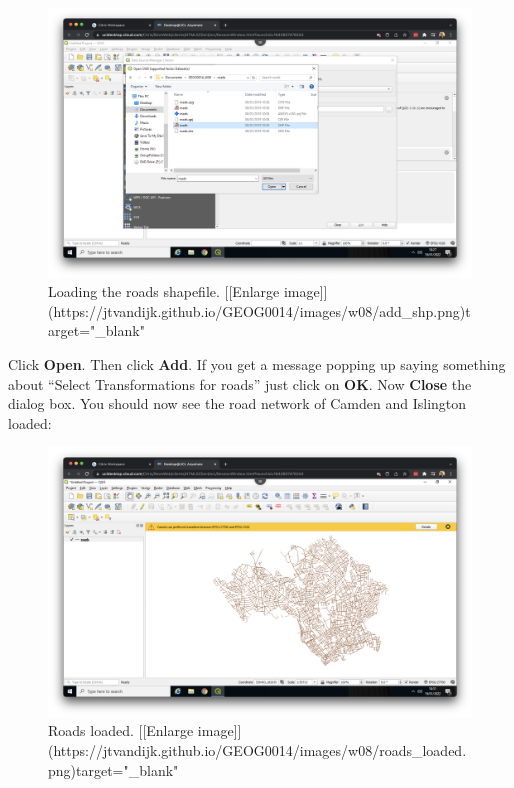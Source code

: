 \documentclass[
]{book}
\begin{document}
\begin{figure}

{\centering \includegraphics[width=850pt]{images/w08/add_shp} 

}

\caption{Loading the roads shapefile. [[Enlarge image]](https://jtvandijk.github.io/GEOG0014/images/w08/add_shp.png){target="_blank"}}\label{fig:add-shp}
\end{figure}

Click \textbf{Open}. Then click \textbf{Add}. If you get a message popping up saying something about ``Select Transformations for roads'' just click on \textbf{OK}. Now \textbf{Close} the dialog box. You should now see the road network of Camden and Islington loaded:

\begin{figure}

{\centering \includegraphics[width=850pt]{images/w08/roads_loaded} 

}

\caption{Roads loaded. [[Enlarge image]](https://jtvandijk.github.io/GEOG0014/images/w08/roads_loaded.png){target="_blank"}}\label{fig:roads-loaded}
\end{figure}
\end{document}
